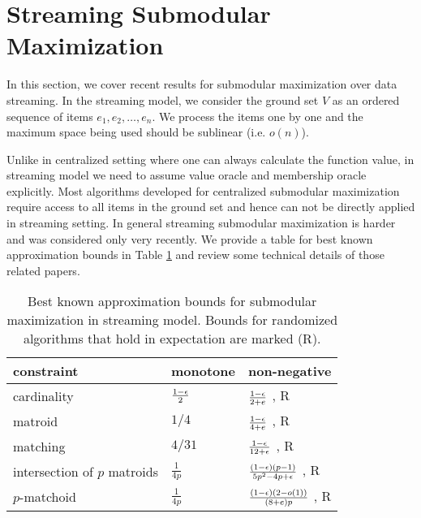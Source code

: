 \section{Streaming Submodular Maximization}
In this section, we cover recent results for submodular maximization over data streaming. In the streaming model, we consider the ground set $V$ as an ordered sequence of items $e_1, e_2, \ldots, e_n$. We process the items one by one and the maximum space being used should be sublinear (i.e. $o(n)$).


Unlike in centralized setting where one can always calculate the function value, in streaming model we need to assume value oracle and membership oracle explicitly.  Most algorithms developed for centralized submodular maximization require access to all items in the ground set and hence can not be directly applied in streaming setting. In general streaming submodular maximization is harder and was considered only very recently. We provide a table for best known approximation bounds in Table \ref{table:streaming} and review some technical details of those related papers.

\begin{table}[t]
\centering
\begin{tabular}{|l|l|l|}
\hline
constraint & monotone  &  non-negative \\
\hline
cardinality & $\frac{1-\epsilon}{2}$ \cite{BMK+14} & $\frac{1 - \epsilon}{2 + e}$ \cite{CGQ15}, R\\
\hline
matroid & $1/4$ \cite{CK14} & $\frac{1 - \epsilon}{4 + e}$ \cite{CGQ15},  R \\
\hline
matching & $4/31$ \cite{CK14} & $\frac{1 - \epsilon}{12 + \epsilon}$ \cite{CGQ15}, R \\
\hline
intersection of $p$ matroids & $\frac{1}{4p}$ \cite{CK14} & $\frac{(1 - \epsilon)(p - 1)}{5p^2 -4p + \epsilon}$ \cite{CGQ15}, R\\
\hline
$p$-matchoid & $\frac{1}{4p}$ \cite{CGQ15} & $\frac{(1-\epsilon)(2-o(1))}{(8+e)p}$ \cite{CGQ15}, R\\
\hline
\end{tabular}
\caption{Best known approximation bounds for submodular maximization in streaming model. Bounds for randomized algorithms that hold in expectation are marked (R).}
\label{table:streaming}
\end{table}






